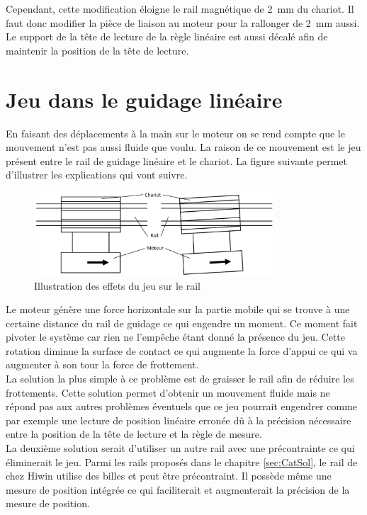 Cependant, cette modification éloigne le rail magnétique de 2~mm du chariot. Il faut donc modifier la pièce de liaison au moteur pour la rallonger
de 2~mm aussi. Le support de la tête de lecture de la règle linéaire est aussi décalé afin de maintenir la position de la tête de lecture.

\section{Jeu dans le guidage linéaire}\label{sec:JeuGuidage}
En faisant des déplacements à la main sur le moteur on se rend compte que le mouvement n'est pas aussi fluide que voulu. La raison de ce mouvement
est le jeu présent entre le rail de guidage linéaire et le chariot. La figure suivante permet d'illustrer les explications qui vont suivre.

\begin{figure}[H]
    \centering
    \includegraphics[width = 0.8\textwidth]{assets/figures/ImprevuJeuRail.svg}
    \caption{Illustration des effets du jeu sur le rail}
    \label{fig:JeuRail}
\end{figure}

Le moteur génère une force horizontale sur la partie mobile qui se trouve à une certaine distance du rail de guidage ce qui engendre un moment.
Ce moment fait pivoter le système car rien ne l'empêche étant donné la présence du jeu. Cette rotation diminue la surface de contact ce qui
augmente la force d'appui ce qui va augmenter à son tour la force de frottement.\\

La solution la plus simple à ce problème est de graisser le rail afin de réduire les frottements. Cette solution permet d'obtenir un mouvement
fluide mais ne répond pas aux autres problèmes éventuels que ce jeu pourrait engendrer comme par exemple une lecture de position linéaire
erronée dû à la précision nécessaire entre la position de la tête de lecture et la règle de mesure.\\

La deuxième solution serait d'utiliser un autre rail avec une précontrainte ce qui éliminerait le jeu. Parmi les rails proposés dans le
chapitre \ref{sec:CatSol}, le rail de chez Hiwin \cite{Hiwin} utilise des billes et peut être précontraint. Il possède même une mesure de
position intégrée ce qui faciliterait et augmenterait la précision de la mesure de position.\\


